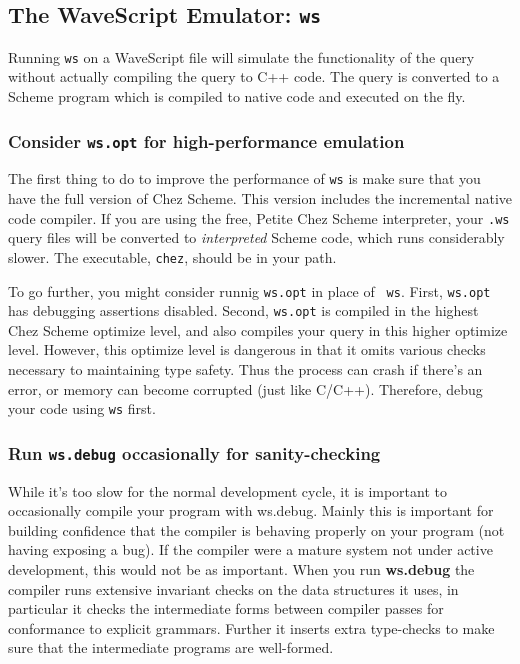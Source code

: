 \documentclass[twocolumn]{report}
\begin{document}
\subsection{The WaveScript Emulator: {\tt \bf ws} }

Running {\tt ws} on a WaveScript file will simulate the functionality
of the query without actually compiling the query to C++ code.  The
query is converted to a Scheme program which is compiled to native
code and executed on the fly.  

\subsubsection*{Consider {\tt \bf ws.opt} for high-performance emulation}

The first thing to do to improve the performance of {\tt ws} is make
sure that you have the full version of Chez Scheme.  This version
includes the incremental native code compiler.  If you are using the
free, Petite Chez Scheme interpreter, your {\tt .ws} query files will
be converted to {\em interpreted} Scheme code, which runs considerably
slower.  The executable, {\tt chez}, should be in your path.

To go further, you might consider runnig {\tt ws.opt} in place of {\tt
ws}.  First, {\tt ws.opt} has debugging assertions disabled. 
Second, {\tt ws.opt} is compiled in the highest Chez Scheme optimize
level, and also compiles your query in this higher optimize level.
However, this optimize level is dangerous in that it omits various
checks necessary to maintaining type safety.  Thus the process can
crash if there's an error, or memory can become corrupted (just like
C/C++).  Therefore, debug your code using {\tt ws} first.

\subsubsection*{Run {\tt \bf ws.debug} occasionally for sanity-checking}

While it's too slow for the normal development cycle, it is important
to occasionally compile your program with ws.debug.  Mainly this is
important for building confidence that the compiler is behaving
properly on your program (not having exposing a bug).  If the compiler
were a mature system not under active development, this would not be
as important.  When you run {\bf ws.debug} the compiler runs extensive
invariant checks on the data structures it uses, in particular it
checks the intermediate forms between compiler passes for
conformance to explicit grammars.  Further it inserts extra
type-checks to make sure that the intermediate programs are well-formed.
\end{document}
